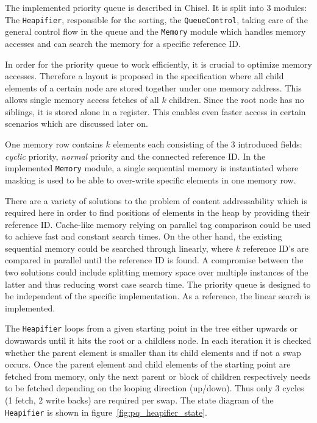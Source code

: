 \documentclass[runningheads]{llncs}
\begin{document}
The implemented priority queue is described in Chisel.
It is split into 3 modules: The \texttt{Heapifier}, responsible for the sorting, the \texttt{QueueControl}, taking care
of the general control flow in the queue and the \texttt{Memory} module which handles memory accesses and can search the memory for a specific reference 
ID.

In order for the priority queue to work efficiently, it is crucial to optimize memory accesses. Therefore a layout is proposed in the specification where all 
child elements of a certain node are stored together under one memory address. This allows single memory access fetches of all $k$ children. Since 
the root node has no siblings, it is stored alone in a register. This enables even faster access in certain scenarios which are discussed later on.

One memory row contains $k$ elements each consisting of the 3 introduced fields: \textit{cyclic} priority, \textit{normal} priority and the connected
reference ID. In the implemented 
\texttt{Memory} module, a single sequential memory is instantiated where masking is used to be able to over-write specific elements in one memory row.

There are a variety of solutions to the problem of content addressability which is required here in order to find positions of elements in the heap by providing
their reference ID. Cache-like memory relying on parallel tag comparison could be used to achieve fast and constant search times. On the other hand, the 
existing sequential memory could be searched through linearly, where $k$ reference ID's are compared in parallel until the reference ID is found.
A compromise between the two solutions could include splitting memory space over multiple instances of the latter and thus reducing worst case search time.
The priority queue is designed to be independent of the specific implementation. As a reference, the linear search is implemented.

The \texttt{Heapifier} loops from a given starting point in the tree either upwards or downwards until it hits the root or a childless node. In each iteration 
it is checked whether the parent element is smaller than its child elements and if not a swap occurs. Once the parent element and child elements of the starting 
point are fetched from memory, only the next parent or block of children respectively needs to be fetched depending on the looping direction (up/down). Thus 
only 3 cycles (1 fetch, 2 write backs) are required per swap. The state diagram of the \texttt{Heapifier} is shown in figure~\ref{fig:pq_heapifier_state}.
\end{document}
